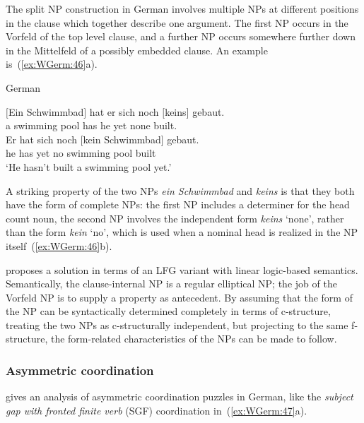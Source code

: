 \documentclass[output=paper,hidelinks]{langscibook}
\begin{document}
The split NP construction in German involves multiple NPs at
different positions in the clause which together describe one argument. The
first NP occurs in the Vorfeld of the top level clause, and a further NP occurs
somewhere further down in the Mittelfeld of a possibly embedded
clause. An example is~(\ref{ex:WGerm:46}a).
%
\begin{exe}
  \ex\label{ex:WGerm:46} German \citep[§1]{kuhn2001}
  \begin{xlist}
  \ex%
  \gll $[$Ein Schwimmbad$]$ hat er sich noch $[$keins$]$ gebaut.\\
  \phantom{$[$}a {swimming pool} has he \REFL{} yet \phantom{$[$}none built.\\
      \ex%
      \gll Er hat sich noch $[$kein Schwimmbad$]$ gebaut.\\
      he has \REFL{} yet  \phantom{$[$}no {swimming pool} built\\
      \glt `He hasn't built a swimming pool yet.'
  \end{xlist}
  \end{exe}
%
A striking property of the two NPs \textit{ein Schwimmbad} and
\textit{keins} is that they both have the form of complete NPs: the
first NP includes a determiner for the head count noun, the second NP
involves the independent form \textit{keins} `none', rather than the form
\textit{kein} `no', which is used when a nominal head is realized in the
NP itself~(\ref{ex:WGerm:46}b).

\citet{kuhn2001} proposes a solution in terms of an LFG variant
with linear logic-based semantics. Semantically, the clause-internal
NP is a regular elliptical NP; the job of the Vorfeld NP is to supply a
property as antecedent. By assuming that the form of the NP can be
syntactically determined completely in terms of c-structure, treating
the two NPs as c-structurally independent, but projecting to the same
f-structure, the form-related characteristics of the NPs can be made to
follow.

\subsubsection{Asymmetric coordination}

\citet{frank:2006} gives an analysis of asymmetric coordination puzzles in German, like the \textit{subject gap with fronted finite verb} (SGF) coordination in~(\ref{ex:WGerm:47}a).
\largerpage[-1]\pagebreak
\end{document}
